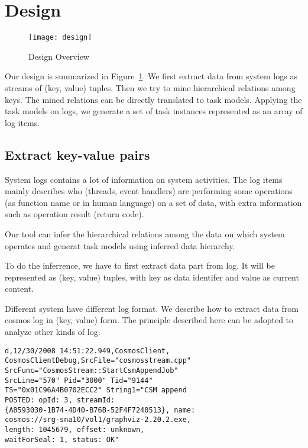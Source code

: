 
\section{Design}
\label{sec:design}

\begin{figure}
\centering
\texttt{[image: design]}
\caption{Design Overview}
\label{fig:design}
\end{figure}

Our design is summarized in Figure~\ref{fig:design}. We
first extract data from system logs as streams of (key,
value) tuples. Then we try to mine hierarchical relations
among keys. The mined relations can be directly translated
to task models. Applying the task models on logs, we
generate a set of task instances represented as an array of
log items.

\subsection{Extract key-value pairs}

System logs contains a lot of information on system
activities. The log items mainly describes who (threads,
event handlers) are performing some operations (as function
name or in human language) on a set of data, with extra
information such as operation result (return code).

Our tool can infer the hierarchical relations among the data
on which system operates and generat task models using
inferred data hierarchy.

To do the inferrence, we have to first extract data part
from log. It will be represented as (key, value) tuples,
with key as data identifer and value as current content.

Different system have different log format. We describe how
to extract data from cosmos log in (key, value) form. The
principle described here can be adopted to analyze other
kinds of log.

\begin{verbatim}
d,12/30/2008 14:51:22.949,CosmosClient,
CosmosClientDebug,SrcFile="cosmosstream.cpp"
SrcFunc="CosmosStream::StartCsmAppendJob" 
SrcLine="570" Pid="3000" Tid="9144"
TS="0x01C96A4B0702ECC2" String1="CSM append
POSTED: opId: 3, streamId:
{A8593030-1B74-4D40-B76B-52F4F7240513}, name:
cosmos://srg-sna10/vol1/graphviz-2.20.2.exe,
length: 1045679, offset: unknown,
waitForSeal: 1, status: OK"
\end{verbatim}

